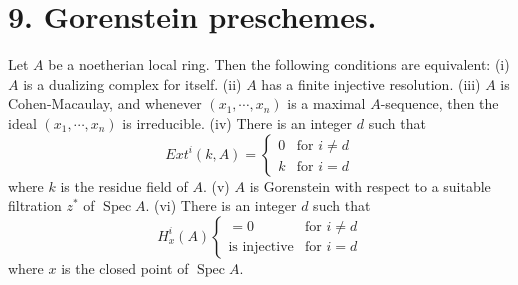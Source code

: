 \documentclass[12pt]{book}
\DeclareMathOperator{\Spec}{Spec}
\begin{document}
\setcounter{page}{293}
\section{9. Gorenstein preschemes.}

\begin{theorem}
Let \(A\) be a noetherian local ring.
Then the following conditions are equivalent:
(i) \(A\) is a dualizing complex for itself.
(ii) \(A\) has a finite injective resolution.
(iii) \(A\) is Cohen-Macaulay, and whenever
\((x_{1}, \cdots, x_{n})\) is a maximal \(A\)-sequence, then the
ideal \((x_{1}, \cdots, x_{n})\) is irreducible.
(iv) There is an integer \(d\) such that
\[Ext^{i}(k, A)=
\begin{cases}
0 & \text{for } i \neq d \\
k & \text{for } i=d
\end{cases}\]
where \(k\) is the residue field of \(A\).
(v) \(A\) is Gorenstein with respect to a suitable
filtration \(z^{*}\) of \(\Spec A\).
(vi) There is an integer \(d\) such that
\[H_{x}^{i}(A)
\begin{cases}
=0 & \text{for } i \neq d \\
\text{is injective} & \text{for } i=d
\end{cases}\]
where \(x\) is the closed point of \(\Spec A\).
\end{theorem}
\end{document}
